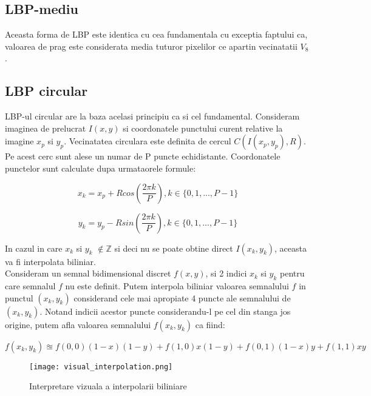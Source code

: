 \subsection{LBP-mediu}

\quad Aceasta forma de LBP este identica cu cea fundamentala cu exceptia
faptului ca, valoarea de prag este considerata media tuturor pixelilor
ce apartin vecinatatii $V_8$.


\subsection{LBP circular}

\quad LBP-ul circular are la baza acelasi principiu ca si cel
fundamental. Consideram imaginea de prelucrat $I(x,y)$ si coordonatele
punctului curent relative la imagine $x_p$ si $y_p$. Vecinatatea 
circulara este definita de cercul $C(I(x_p,y_p), R)$. Pe acest 
cerc sunt alese un numar de P puncte echidistante. Coordonatele 
punctelor sunt calculate dupa urmataorele formule:
	
\begin{equation}
	x_k = x_p + Rcos(\frac{2 \pi k}{P}), k \in {\{0,1,...,P-1\}}
\end{equation}

\begin{equation}
	y_k = y_p - Rsin(\frac{2 \pi k}{P}), k \in {\{0,1,...,P-1\}}
\end{equation}

In cazul in care $x_k$ si $y_k$ $\notin \mathbb{Z}$ si deci nu se 
poate obtine direct $ I(x_k, y_k) $, aceasta va fi interpolata 
biliniar. \\

Consideram un semnal bidimensional discret $ f(x,y) $, si 2 
indici $x_k$ si $y_k$ pentru care semnalul $ f $ nu este
definit. Putem interpola biliniar valoarea semnalului $ f $
in punctul $(x_k ,y_k)$ considerand cele mai apropiate 4 puncte ale semnalului
de $(x_k ,y_k)$. Notand indicii acestor puncte considerandu-l pe
cel din stanga jos origine, putem afla valoarea semnalului 
$f(x_k ,y_k)$ ca fiind: 

\begin{equation}
	f(x_k ,y_k) \approxeq f(0,0)(1-x)(1-y) + f(1,0)x(1-y) + f(0,1)(1-x)y
	+ f(1,1)xy
\end{equation}

\begin{figure}[H]
	\texttt{[image: visual\_interpolation.png]}
	\centering
	\caption{Interpretare vizuala a interpolarii biliniare}
\end{figure}


